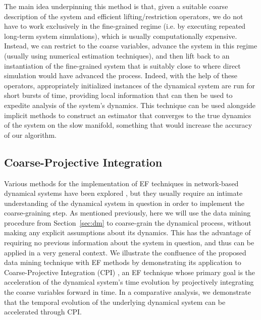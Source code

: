The main idea underpinning this method is that, given a suitable
coarse description of the system and efficient lifting/restriction
operators, we do not have to work exclusively in the fine-grained
regime (i.e. by executing repeated long-term system simulations),
which is usually computationally expensive. Instead, we can restrict
to the coarse variables, advance the system in this regime (usually
using numerical estimation techniques), and then lift back to an
instantiation of the fine-grained system that is suitably close to
where direct simulation would have advanced the process. Indeed, with
the help of these operators, appropriately initialized instances of
the dynamical system are run for short bursts of time, providing local
information that can then be used to expedite analysis of the system's
dynamics. This technique can be used alongside implicit methods
\cite{marschler_implicit_2014} to construct an estimator that converges
to the true dynamics of the system on the slow manifold, something
that would increase the accuracy of our algorithm.


\subsection{Coarse-Projective Integration}

Various methods for the implementation of EF techniques in
network-based dynamical systems have been explored
\cite{bold_equation-free_2014} \cite{holiday_equation-free_2016}, but they usually
require an intimate understanding of the dynamical system in question
in order to implement the coarse-graining step. As mentioned
previously, here we will use the data mining procedure from
Section~\ref{sec:dm} to coarse-grain the dynamical process, without
making any explicit assumptions about its dynamics. This has the
advantage of requiring no previous information about the system in
question, and thus can be applied in a very general context. We
illustrate the confluence of the proposed data mining technique with
EF methods by demonstrating its application to Coarse-Projective
Integration (CPI) \cite{gear_projective_2003}, an EF technique whose
primary goal is the acceleration of the dynamical system's time
evolution by projectively integrating the coarse variables forward in
time. In a comparative analysis, we demonstrate that the temporal
evolution of the underlying dynamical system can be accelerated
through CPI.

